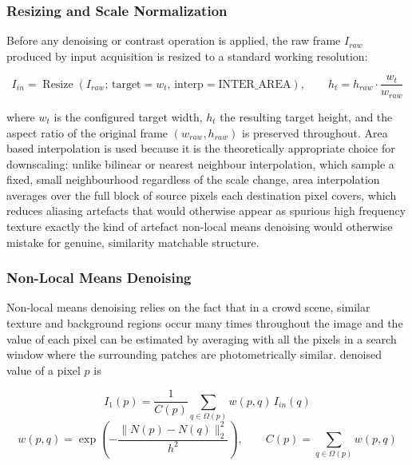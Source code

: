 \documentclass[12pt,a4paper]{report}
\begin{document}
\subsubsection{Resizing and Scale Normalization}

Before any denoising or contrast operation is applied, the raw frame $I_{raw}$ produced by input acquisition is resized to a standard working resolution:

\begin{equation}
	I_{in} = \operatorname{Resize}\left(I_{raw};\, \text{target}=w_{t},\, \text{interp}=\text{INTER\_AREA}\right), \qquad h_{t} = h_{raw} \cdot \frac{w_{t}}{w_{raw}}
	\label{eq:resize}
\end{equation}

where $w_t$ is the configured target width, $h_t$ the resulting target height, and the aspect ratio of the original frame $(w_{raw}, h_{raw})$ is preserved throughout. Area based interpolation is used because it is the theoretically appropriate choice for downscaling: unlike bilinear or nearest neighbour interpolation, which sample a fixed, small neighbourhood regardless of the scale change, area interpolation averages over the full block of source pixels each destination pixel covers, which reduces aliasing artefacts that would otherwise appear as spurious high frequency texture exactly the kind of artefact non-local means denoising would otherwise mistake for genuine, similarity matchable structure.

\subsubsection{Non-Local Means Denoising}

Non-local means denoising relies on the fact that in a crowd scene, similar texture and background regions occur many times throughout the image and the value of each pixel can be estimated by averaging with all the pixels in a search window where the surrounding patches are photometrically similar. denoised value of a pixel $p$ is

\begin{equation}
	I_{1}(p) = \frac{1}{C(p)} \sum_{q \in \Omega(p)} w(p,q)\, I_{in}(q)
	\label{eq:nlm-estimate}
\end{equation}
\begin{equation}
	w(p,q) = \exp\left(-\frac{\lVert N(p) - N(q) \rVert_2^2}{h^2}\right), \qquad C(p) = \sum_{q \in \Omega(p)} w(p,q)
	\label{eq:nlm-weight}
\end{equation}
\end{document}
